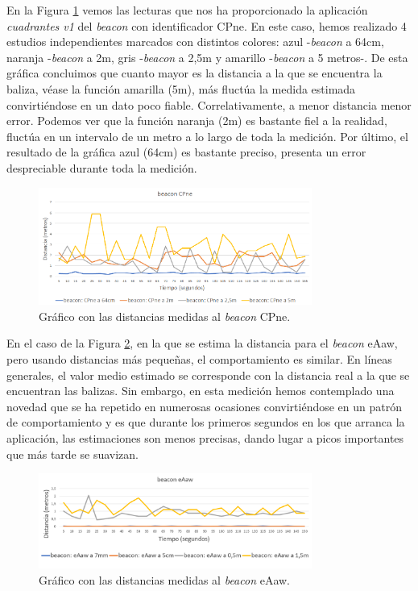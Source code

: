 En la Figura \ref{fig:dist_CPne} vemos las lecturas que nos ha proporcionado la aplicación \textit{cuadrantes v1} del \textit{beacon} con identificador CPne. En este caso, hemos realizado 4 estudios independientes marcados con distintos colores: azul -\textit{beacon} a 64cm, naranja -\textit{beacon} a 2m, gris -\textit{beacon} a 2,5m y amarillo -\textit{beacon} a 5 metros-. De esta gráfica concluimos que cuanto mayor es la distancia a la que se encuentra la baliza, véase la función amarilla (5m), más fluctúa la medida estimada convirtiéndose en un dato poco fiable. Correlativamente, a menor distancia menor error. Podemos ver que la función naranja (2m) es bastante fiel a la realidad, fluctúa en un intervalo de un metro a lo largo de toda la medición. Por último, el resultado de la gráfica azul (64cm) es bastante preciso, presenta un error despreciable durante toda la medición.

\begin{figure}[t]
	\centering
	\includegraphics[width=0.8\textwidth]{Imagenes/Descripciondeltrabajo/dist_CPne}
	\caption{Gráfico con las distancias medidas al \textit{beacon} CPne. }
	\label{fig:dist_CPne}
\end{figure}

En el caso de la Figura \ref{fig:dist_eAaw}, en la que se estima la distancia para el \textit{beacon} eAaw, pero usando distancias más pequeñas, el comportamiento es similar. En líneas generales, el valor medio estimado se corresponde con la distancia real a la que se encuentran las balizas. Sin embargo, en esta medición hemos contemplado una novedad que se ha repetido en numerosas ocasiones convirtiéndose en un patrón de comportamiento y es que durante los primeros segundos en los que arranca la aplicación, las estimaciones son menos precisas, dando lugar a picos importantes que más tarde se suavizan. 
\begin{figure}[t]
	\centering
	\includegraphics[width=0.8\textwidth]{Imagenes/Descripciondeltrabajo/dist_eAaw}
	\caption{Gráfico con las distancias medidas al \textit{beacon} eAaw. }
	\label{fig:dist_eAaw}
\end{figure}


